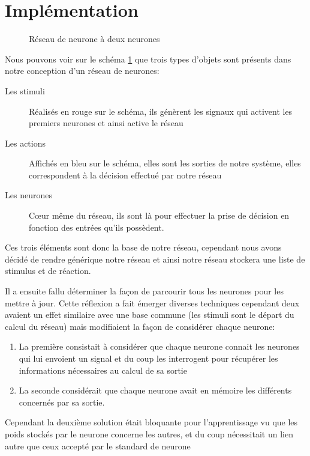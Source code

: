 \section{Implémentation}

\begin{figure}[ht]
  \centering
  
  \caption{Réseau de neurone à deux neurones}
  \label{graphInit}
\end{figure}

Nous pouvons voir sur le schéma \ref{graphInit} que trois types d'objets sont
présents dans notre conception d'un réseau de neurones:\\
\begin{description}
  \item[Les stimuli] Réalisés en rouge sur le schéma, ils génèrent les signaux
    qui activent les premiers neurones et ainsi active le réseau
  \item[Les actions] Affichés en bleu sur le schéma, elles sont les sorties de
    notre système, elles correspondent à la décision effectué par notre réseau
  \item[Les neurones] Cœur même du réseau, ils sont là pour effectuer la prise
    de décision en fonction des entrées qu'ils possèdent.
\end{description}


Ces trois éléments sont donc la base de notre réseau, cependant nous avons
décidé de rendre générique notre réseau et ainsi notre réseau stockera une liste
de stimulus et de réaction.

Il a ensuite fallu déterminer la façon de parcourir tous les neurones pour les
mettre à jour. Cette réflexion a fait émerger diverses techniques cependant deux
avaient un effet similaire avec une base commune (les stimuli sont le départ du
calcul du réseau) mais modifiaient la façon de considérer chaque
neurone:\\

\begin{enumerate}
  \item La première consistait à considérer que chaque neurone connait les
    neurones qui lui envoient un signal et du coup les interrogent pour
    récupérer les informations nécessaires au calcul de sa sortie
  \item La seconde  considérait que chaque neurone avait en mémoire les différents
      concernés par sa sortie.
\end{enumerate}

Cependant la deuxième solution était bloquante pour l'apprentissage vu que les
poids stockés par le neurone concerne les autres, et du coup nécessitait un lien
autre que ceux accepté par le standard de neurone

